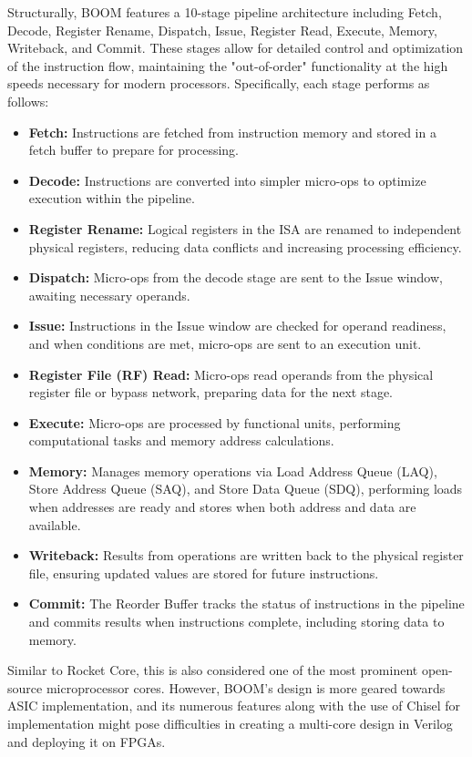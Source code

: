 Structurally, BOOM features a 10-stage pipeline architecture including Fetch, Decode, Register Rename, Dispatch, Issue, Register Read, Execute, Memory, Writeback, and Commit. These stages allow for detailed control and optimization of the instruction flow, maintaining the "out-of-order" functionality at the high speeds necessary for modern processors. Specifically, each stage performs as follows:
\begin{itemize}
    \item \textbf{Fetch:} Instructions are fetched from instruction memory and stored in a fetch buffer to prepare for processing.
    \item \textbf{Decode:} Instructions are converted into simpler micro-ops to optimize execution within the pipeline.
    \item \textbf{Register Rename:} Logical registers in the ISA are renamed to independent physical registers, reducing data conflicts and increasing processing efficiency.
    \item \textbf{Dispatch:} Micro-ops from the decode stage are sent to the Issue window, awaiting necessary operands.
    \item \textbf{Issue:} Instructions in the Issue window are checked for operand readiness, and when conditions are met, micro-ops are sent to an execution unit.
    \item \textbf{Register File (RF) Read:} Micro-ops read operands from the physical register file or bypass network, preparing data for the next stage.
    \item \textbf{Execute:} Micro-ops are processed by functional units, performing computational tasks and memory address calculations.
    \item \textbf{Memory:} Manages memory operations via Load Address Queue (LAQ), Store Address Queue (SAQ), and Store Data Queue (SDQ), performing loads when addresses are ready and stores when both address and data are available.
    \item \textbf{Writeback:} Results from operations are written back to the physical register file, ensuring updated values are stored for future instructions.
    \item \textbf{Commit:} The Reorder Buffer tracks the status of instructions in the pipeline and commits results when instructions complete, including storing data to memory.
\end{itemize}

Similar to Rocket Core, this is also considered one of the most prominent open-source microprocessor cores. However, BOOM's design is more geared towards ASIC implementation, and its numerous features along with the use of Chisel for implementation might pose difficulties in creating a multi-core design in Verilog and deploying it on FPGAs.

